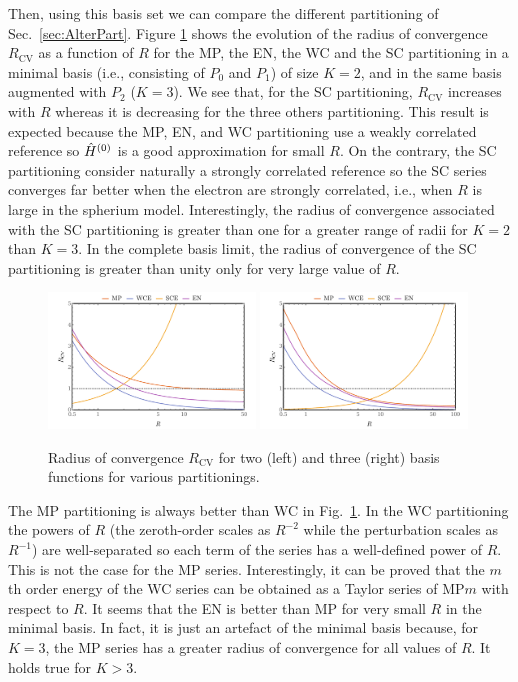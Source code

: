 \documentclass[11pt,a4paper]{article}
\newcommand{\hH}{\Hat{H}}
\begin{document}
Then, using this basis set we can compare the different partitioning of Sec.~\ref{sec:AlterPart}. Figure \ref{fig:RadiusPartitioning} shows the evolution of the radius of convergence $R_{\text{CV}}$ as a function of $R$ for the MP, the EN, the WC and the SC partitioning in a minimal basis (i.e., consisting of $P_0$ and $P_1$) of size $K = 2$, and in the same basis augmented with $P_2$ ($K = 3$). We see that, for the SC partitioning, $R_{\text{CV}}$ increases with $R$ whereas it is decreasing for the three others partitioning. This result is expected because the MP, EN, and WC partitioning use a weakly correlated reference so $\hH^{(0)}$ is a good approximation for small $R$. On the contrary, the SC partitioning consider naturally a strongly correlated reference so the SC series converges far better when the electron are strongly correlated, i.e., when $R$ is large in the spherium model.
Interestingly, the radius of convergence associated with the SC partitioning is greater than one for a greater range of radii for $K = 2$ than $K = 3$. 
In the complete basis limit, the radius of convergence of the SC partitioning is greater than unity only for very large value of $R$.

\begin{figure}
    \centering
    \includegraphics[width=0.49\textwidth]{PartitioningRCV2.pdf}
    \includegraphics[width=0.49\textwidth]{PartitioningRCV3.pdf}
    \caption{Radius of convergence $R_{\text{CV}}$ for two (left) and three (right) basis functions for various partitionings.}
    \label{fig:RadiusPartitioning}
\end{figure}
The MP partitioning is always better than WC in Fig.~\ref{fig:RadiusPartitioning}. In the WC partitioning the powers of $R$ (the zeroth-order scales as $R^{-2}$ while the perturbation scales as $R^{-1}$) are well-separated so each term of the series has a well-defined power of $R$. This is not the case for the MP series.
Interestingly, it can be proved that the $m$th order energy of the WC series can be obtained as a Taylor series of MP$m$ with respect to $R$. 
It seems that the EN is better than MP for very small $R$ in the minimal basis. In fact, it is just an artefact of the minimal basis because, for $K = 3$, the MP series has a greater radius of convergence for all values of $R$. It holds true for $K>3$.
\end{document}
